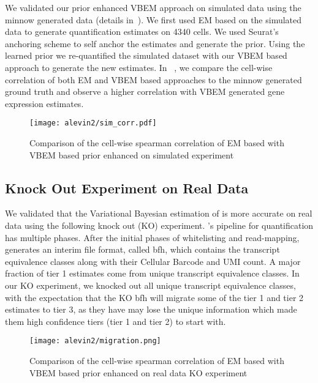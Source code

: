 We validated our prior enhanced VBEM approach on simulated data using the minnow generated data (details in~). 
We first used EM based \alevin on the simulated data to generate quantification
estimates on 4340 cells. We used Seurat's anchoring scheme to self anchor the estimates and generate the
prior. Using the learned prior we re-quantified the simulated dataset with our VBEM based approach to generate 
the new estimates. In ~, we compare the cell-wise correlation of both EM and  VBEM 
based approaches to the minnow generated ground truth and observe a higher correlation with VBEM generated
gene expression estimates.

  \begin{figure}[!htb]
      \centering
    \texttt{[image: alevin2/sim\_corr.pdf]}
    \caption{ Comparison of the cell-wise spearman correlation of EM based \alevin with VBEM based
    prior enhanced \alevin on simulated experiment}
    \label{fig:alv2_sim_val}
  \end{figure}

\subsection{Knock Out Experiment on Real Data}
\label{subsec:alv2_real}
We validated that the Variational Bayesian estimation of \alevin is more accurate on real data using the
following knock out (KO) experiment. \Alevin 's pipeline for \dscrnaseq quantification has multiple 
phases. After the initial phases of whitelisting and read-mapping, \alevin generates an interim 
file format, called bfh, which contains the transcript equivalence classes along with their Cellular
Barcode and UMI count. A major fraction of tier 1 estimates come from unique transcript equivalence
classes. In our KO experiment, we knocked out all unique transcript equivalence classes, with
the expectation that the KO bfh will migrate some of the tier 1 and tier 2 estimates to tier 3, as they have
may lose the unique information which made them high confidence tiers (tier 1 and tier 2) to start with. 

  \begin{figure}[!htb]
      \centering
    \texttt{[image: alevin2/migration.png]}
    \caption{ Comparison of the cell-wise spearman correlation of EM based \alevin with  VBEM  based
    prior enhanced \alevin on real data KO experiment}
    \label{fig:alv2_real_val}
  \end{figure}

